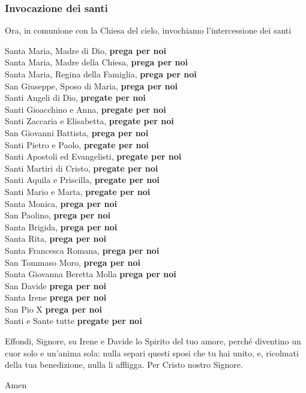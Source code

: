 \newpage

\subsubsection*{Invocazione dei santi}

	\begin{dialoghi}
	\item[\sacerdote] Ora, in comunione con la Chiesa del cielo, invochiamo l'intercessione dei santi

	Santa Maria, Madre di Dio, \textbf{prega per noi}\\
	Santa Maria, Madre della Chiesa, \textbf{prega per noi}\\
	Santa Maria, Regina della Famiglia, \textbf{prega per noi}\\
	San Giuseppe, Sposo di Maria, \textbf{prega per noi}\\
	Santi Angeli di Dio, \textbf{pregate per noi}\\
	Santi Gioacchino e Anna, \textbf{pregate per noi}\\
	Santi Zaccaria e Elisabetta, \textbf{pregate per noi}\\
	San Giovanni Battista, \textbf{prega per noi}\\
	Santi Pietro e Paolo, \textbf{pregate per noi}\\
	Santi Apostoli ed Evangelisti, \textbf{pregate per noi}\\
	Santi Martiri di Cristo, \textbf{pregate per noi}\\
	Santi Aquila e Priscilla, \textbf{pregate per noi}\\
	Santi Mario e Marta, \textbf{pregate per noi}\\
	Santa Monica, \textbf{prega per noi}\\
	San Paolino, \textbf{prega per noi}\\
	Santa Brigida, \textbf{prega per noi}\\
	Santa Rita, \textbf{prega per noi}\\
	Santa Francesca Romana, \textbf{prega per noi}\\
	San Tommaso Moro, \textbf{prega per noi}\\
	Santa Giovanna Beretta Molla \textbf{prega per noi}\\
	San Davide \textbf{prega per noi}\\
	Santa Irene \textbf{prega per noi}\\
	San Pio X \textbf{prega per noi}\\
	Santi e Sante tutte \textbf{pregate per noi}
	\item[\sacerdote] Effondi, Signore, su Irene e Davide lo Spirito del tuo amore, perché diventino un cuor solo e un'anima sola: nulla separi questi sposi che tu hai unito, e, ricolmati della tua benedizione, nulla li affligga. Per Cristo nostro Signore.
	\item[\assemblea] Amen
	\end{dialoghi}

\newpage